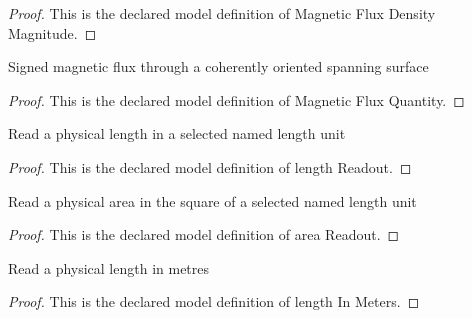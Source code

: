 \begin{proof}
  This is the declared model definition of Magnetic Flux Density Magnitude.
\end{proof}
\begin{definition}
  \label{def:physics:phyx-mini-0929:phyxminiproblems-problemphyxmini0929-magneticfluxquantity}
  Signed magnetic flux through a coherently oriented spanning surface
\end{definition}
\begin{proof}
  This is the declared model definition of Magnetic Flux Quantity.
\end{proof}
\begin{definition}
  \label{def:physics:phyx-mini-0929:phyxminiproblems-problemphyxmini0929-lengthreadout}
  Read a physical length in a selected named length unit
\end{definition}
\begin{proof}
  This is the declared model definition of length Readout.
\end{proof}
\begin{definition}
  \label{def:physics:phyx-mini-0929:phyxminiproblems-problemphyxmini0929-areareadout}
  Read a physical area in the square of a selected named length unit
\end{definition}
\begin{proof}
  This is the declared model definition of area Readout.
\end{proof}
\begin{definition}
  \label{def:physics:phyx-mini-0929:phyxminiproblems-problemphyxmini0929-lengthinmeters}
  Read a physical length in metres
\end{definition}
\begin{proof}
  This is the declared model definition of length In Meters.
\end{proof}
